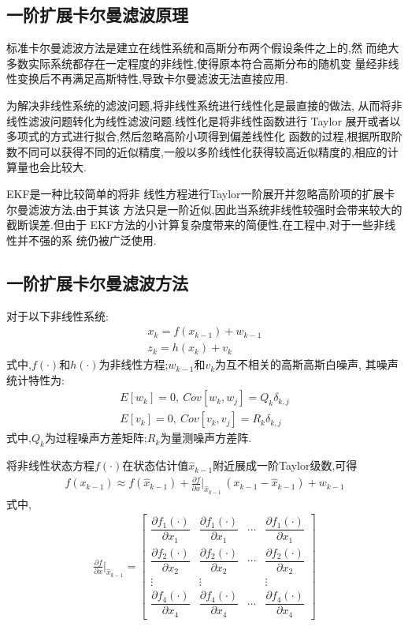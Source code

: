 \documentclass[12pt]{article}
\numberwithin{equation}{section} %
\begin{document}
\subsection{一阶扩展卡尔曼滤波原理}
标准卡尔曼滤波方法是建立在线性系统和高斯分布两个假设条件之上的,然
而绝大多数实际系统都存在一定程度的非线性,使得原本符合高斯分布的随机变
量经非线性变换后不再满足高斯特性,导致卡尔曼滤波无法直接应用.

为解决非线性系统的滤波问题,将非线性系统进行线性化是最直接的做法,
从而将非线性滤波问题转化为线性滤波问题.线性化是将非线性函数进行
Taylor 展开或者以多项式的方式进行拟合,然后忽略高阶小项得到偏差线性化
函数的过程,根据所取阶数不同可以获得不同的近似精度,一般以多阶线性化获得较高近似精度的,相应的计算量也会比较大.

EKF是一种比较简单的将非
线性方程进行Taylor一阶展开并忽略高阶项的扩展卡尔曼滤波方法,由于其该
方法只是一阶近似,因此当系统非线性较强时会带来较大的截断误差.但由于
EKF方法的小计算复杂度带来的简便性,在工程中,对于一些非线性并不强的系
统仍被广泛使用.
\subsection{一阶扩展卡尔曼滤波方法}
对于以下非线性系统:
\begin{align}
    x_k = f(x_{k-1}) + w_{k-1}\\
    z_k = h(x_k) + v_k
\end{align}
式中,$f(\cdot)$和$h(\cdot)$为非线性方程;$w_{k-1}$和$v_k$为互不相关的高斯高斯白噪声,
其噪声统计特性为:
\begin{align}
    E[w_k] = 0, ~Cov[w_k,w_j] = Q_k\delta_{k,j}\\
    E[v_k] = 0, ~Cov[v_k,v_j] = R_k\delta_{k,j}
\end{align}
式中,$Q_k$为过程噪声方差矩阵;$R_k$为量测噪声方差阵.

将非线性状态方程$f(\cdot)$在状态估计值$\hat{x}_{k-1}$附近展成一阶Taylor级数,可得
\begin{align}
    f(x_{k-1})\approx f(\hat{x}_{k-1})+\frac{\partial f}{\partial x}\biggl\vert_{\hat{x}_{k-1}}\,(x_{k-1}-\hat{x}_{k-1}) + w_{k-1}
\end{align}
式中,
\begin{align}
    \frac{\partial f}{\partial x}\bigg \vert_{\hat{x}_{k-1}} = 
    \begin{bmatrix}
     \dfrac{\partial f_1(\cdot)}{\partial x_1} & \dfrac{\partial f_1(\cdot)}{\partial x_1} & \cdots & \dfrac{\partial f_1(\cdot)}{\partial x_1}\\
     \dfrac{\partial f_2(\cdot)}{\partial x_2} & \dfrac{\partial f_2(\cdot)}{\partial x_2} & \cdots & \dfrac{\partial f_2(\cdot)}{\partial x_2}\\
     \vdots & \vdots &  & \vdots\\
     \dfrac{\partial f_4(\cdot)}{\partial x_4} & \dfrac{\partial f_4(\cdot)}{\partial x_4} & \cdots & \dfrac{\partial f_4(\cdot)}{\partial x_4}
    \end{bmatrix}
\end{align}
\end{document}
